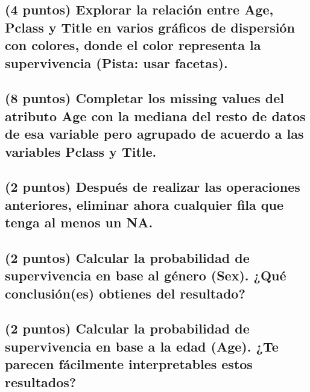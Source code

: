 \documentclass[]{article}
\begin{document}
\subsection{\texorpdfstring{(4 puntos) Explorar la relación entre
\textbf{Age}, \textbf{Pclass} y \textbf{Title} en varios gráficos de
dispersión con colores, donde el color representa la supervivencia
(Pista: usar
facetas).}{(4 puntos) Explorar la relación entre Age, Pclass y Title en varios gráficos de dispersión con colores, donde el color representa la supervivencia (Pista: usar facetas).}}\label{puntos-explorar-la-relacion-entre-age-pclass-y-title-en-varios-graficos-de-dispersion-con-colores-donde-el-color-representa-la-supervivencia-pista-usar-facetas.}

\subsection{\texorpdfstring{(8 puntos) Completar los missing values del
atributo \textbf{Age} con la mediana del resto de datos de esa variable
pero agrupado de acuerdo a las variables \textbf{Pclass} y
\textbf{Title}.}{(8 puntos) Completar los missing values del atributo Age con la mediana del resto de datos de esa variable pero agrupado de acuerdo a las variables Pclass y Title.}}\label{puntos-completar-los-missing-values-del-atributo-age-con-la-mediana-del-resto-de-datos-de-esa-variable-pero-agrupado-de-acuerdo-a-las-variables-pclass-y-title.}

\subsection{(2 puntos) Después de realizar las operaciones anteriores,
eliminar ahora cualquier fila que tenga al menos un
NA.}\label{puntos-despues-de-realizar-las-operaciones-anteriores-eliminar-ahora-cualquier-fila-que-tenga-al-menos-un-na.}

\subsection{(2 puntos) Calcular la probabilidad de supervivencia en base
al género (Sex). ¿Qué conclusión(es) obtienes del
resultado?}\label{puntos-calcular-la-probabilidad-de-supervivencia-en-base-al-genero-sex.-que-conclusiones-obtienes-del-resultado}

\subsection{\texorpdfstring{(2 puntos) Calcular la probabilidad de
supervivencia en base a la edad (\textbf{Age}). ¿Te parecen fácilmente
interpretables estos
resultados?}{(2 puntos) Calcular la probabilidad de supervivencia en base a la edad (Age). ¿Te parecen fácilmente interpretables estos resultados?}}\label{puntos-calcular-la-probabilidad-de-supervivencia-en-base-a-la-edad-age.-te-parecen-facilmente-interpretables-estos-resultados}
\end{document}
